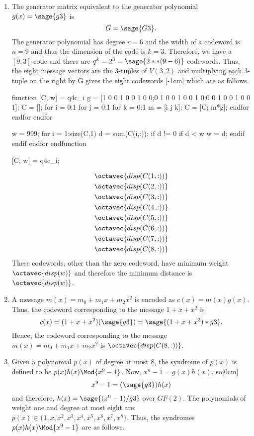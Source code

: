 \begin{enumerate}[label=(\roman*)]
\item %
The generator matrix equivalent to the generator polynomial $g(x)=\sage{g3}$ is
\[
G = \sage{G3}.
\]
The generator polynomial has degree $r=6$ and the width of a codeword is $n=9$ and thus the dimension of the code is $k=3$. Therefore, we have a $[9,3]$-code and there are $q^k = 2^{3}=\sage{2**(9-6)}$ codewords. Thus, the eight message vectors are the 3-tuples of $V(3,2)$ and  multiplying each 3-tuple on the right by G gives the eight codewords [-1cm] which are as follows.
\begin{octavecode}
function [C, w] = q4c_i
 g = [1 0 0 1 0 0 1 0 0;0 1 0 0 1 0 0 1 0;0 0 1 0 0 1 0 0 1];
 C = [];
 for i = 0:1
   for j = 0:1
     for k = 0:1
       m = [i j k];
       C = [C; m*g];
     endfor
   endfor
 endfor

 w = 999;
 for i = 1:size(C,1)
   d = sum(C(i,:));
   if  d != 0
     if d < w
       w = d;
     endif
   endif
 endfor
endfunction

[C, w] = q4c_i;
\end{octavecode}
\begin{align*}
	\octavec{disp(C(1,:))}\\
	\octavec{disp(C(2,:))}\\
	\octavec{disp(C(3,:))}\\
	\octavec{disp(C(4,:))}\\
	\octavec{disp(C(5,:))}\\
	\octavec{disp(C(6,:))}\\
	\octavec{disp(C(7,:))}\\
	\octavec{disp(C(8,:))}\\
\end{align*}
These codewords, other than the zero codeword, have minimum weight $\octavec{disp(w)}$ and therefore the minimum distance is $\octavec{disp(w)}$.
\item %
A message $m(x) = m_0 + m_1x + m_2x^2$ is encoded as $c(x)=m(x)g(x)$. Thus, the codeword corresponding to the message $1+x+x^2$ is
\[
	c(x) = (1+x+x^2)(\sage{g3}) = \sage{(1+x+x^2)*g3}.
\]
Hence, the codeword corresponding to the message $m(x) = m_0 + m_1x + m_2x^2$ is  $\octavec{disp(C(8,:))}$.
\item %
Given a polynomial $p(x)$ of degree at most 8, the syndrome of $p(x)$ is defined to be $p(x)h(x)\Mod{x^9-1}$. Now, $x^n-1=g(x)h(x)$, so[0cm]
\[x^9 - 1 = (\sage{g3})h(x)\]
and therefore, $h(x) =\sage{(x^9-1)/g3}$ over $GF(2)$. The polynomials of weight one  and degree at most eight are: $p(x) \in \{1,x,x^2,x^3,x^4,x^5,x^6,x^7,x^8\}$. Thus, the syndromes $p(x)h(x)\Mod{x^9-1}$ are as follows.


\end{enumerate}
